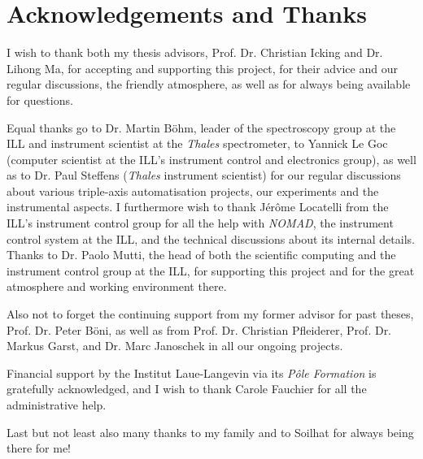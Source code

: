 %
%

\chapter*{Acknowledgements and Thanks}

I wish to thank both my thesis advisors, Prof. Dr. Christian Icking and Dr. Lihong Ma, for accepting
and supporting this project, for their advice and our regular discussions, the friendly atmosphere, 
as well as for always being available for questions.

Equal thanks go to Dr. Martin B\"ohm, leader of the spectroscopy group at the ILL and instrument
scientist at the \textit{Thales} spectrometer, to Yannick Le Goc (computer scientist at the ILL's instrument
control and electronics group), as well as to Dr. Paul Steffens (\textit{Thales} instrument scientist) for our
regular discussions about various triple-axis automatisation projects, our experiments and the
instrumental aspects. I furthermore wish to thank Jérôme Locatelli from the ILL's instrument control group for
all the help with \textit{NOMAD}, the instrument control system at the ILL, and the technical discussions
about its internal details. 
Thanks to Dr. Paolo Mutti, the head of both the scientific computing and the instrument control group 
at the ILL, for supporting this project and for the great atmosphere and working environment there.

Also not to forget the continuing support from my former advisor for past theses, Prof. Dr. Peter B\"oni,
as well as from Prof. Dr. Christian Pfleiderer, Prof. Dr. Markus Garst, and Dr. Marc Janoschek in all our ongoing projects.

Financial support by the Institut Laue-Langevin via its \textit{P\^ole Formation} is gratefully acknowledged,
and I wish to thank Carole Fauchier for all the administrative help.

Last but not least also many thanks to my family and to Soilhat for always being there for me!
